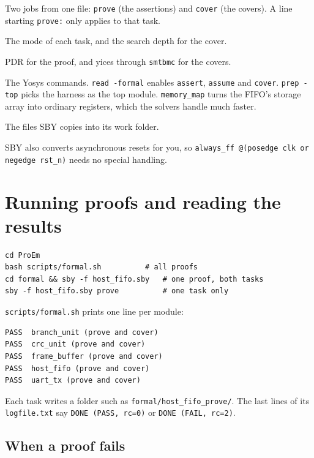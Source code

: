\documentclass[11pt,a4paper]{article}
\newcommand{\file}[1]{\texttt{#1}}
\begin{document}
\begin{description}[style=nextline,leftmargin=1.5em]
\item[\texttt{[tasks]}] Two jobs from one file: \texttt{prove} (the assertions) and \texttt{cover} (the covers). A line starting \texttt{prove:} only applies to that task.
\item[\texttt{[options]}] The mode of each task, and the search depth for the cover.
\item[\texttt{[engines]}] PDR for the proof, and yices through \texttt{smtbmc} for the covers.
\item[\texttt{[script]}] The Yosys commands. \texttt{read -formal} enables \texttt{assert}, \texttt{assume} and \texttt{cover}. \texttt{prep -top} picks the harness as the top module. \texttt{memory\_map} turns the FIFO's storage array into ordinary registers, which the solvers handle much faster.
\item[\texttt{[files]}] The files SBY copies into its work folder.
\end{description}

SBY also converts asynchronous resets for you, so \texttt{always\_ff @(posedge clk or negedge rst\_n)} needs no special handling.

\section{Running proofs and reading the results}

\begin{lstlisting}
cd ProEm
bash scripts/formal.sh          # all proofs
cd formal && sby -f host_fifo.sby   # one proof, both tasks
sby -f host_fifo.sby prove          # one task only
\end{lstlisting}

\file{scripts/formal.sh} prints one line per module:

\begin{lstlisting}
PASS  branch_unit (prove and cover)
PASS  crc_unit (prove and cover)
PASS  frame_buffer (prove and cover)
PASS  host_fifo (prove and cover)
PASS  uart_tx (prove and cover)
\end{lstlisting}

Each task writes a folder such as \file{formal/host\_fifo\_prove/}. The last lines of its \file{logfile.txt} say \texttt{DONE (PASS, rc=0)} or \texttt{DONE (FAIL, rc=2)}.

\subsection{When a proof fails}
\end{document}

